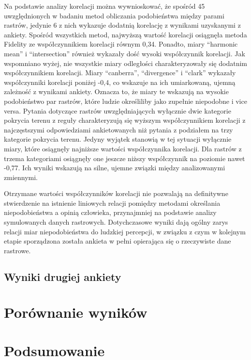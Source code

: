 \documentclass{amuthesis}
\begin{document}
Na podstawie analizy korelacji można wywnioskować, że spośród 45
uwzględnionych w badaniu metod obliczania podobieństwa między parami
rastrów, jedynie 6 z nich wykazuje dodatnią korelację z wynikami
uzyskanymi z ankiety. Spośród wszystkich metod, najwyższą wartość
korelacji osiągnęła metoda Fidelity ze współczynnikiem korelacji równym
0,34. Ponadto, miary ``harmonic mean'' i ``intersection'' również
wykazały dość wysoki współczynnik korelacji. Jak wspomniano wyżej, nie
wszystkie miary odległości charakteryzowały się dodatnim współczynnikiem
korelacji. Miary ``canberra'', ``divergence'' i ``clark'' wykazały
współczynniki korelacji poniżej -0,4, co wskazuje na ich umiarkowaną,
ujemną zależność z wynikami ankiety. Oznacza to, że miary te wskazują na
wysokie podobieństwo par rastrów, które ludzie określiliby jako zupełnie
niepodobne i vice versa. Pytania dotyczące rastrów uwzględniających
wyłącznie dwie kategorie pokrycia terenu z reguły charakteryzują się
wyższym współczynnikiem korelacji z najczęstszymi odpowiedziami
ankietowanych niż pytania z podziałem na trzy kategorie pokrycia terenu.
Jedyny wyjątek stanowią w tej sytuacji wyłącznie miary, które osiągnęły
najniższe wartości współczynnika korelacji. Dla rastrów z trzema
kategoriami osiągnęły one jeszcze niższy współczynnik na poziomie nawet
-0,77. Ich wyniki wskazują na silne, ujemne związki między analizowanymi
zmiennymi.

Otrzymane wartości współczynników korelacji nie pozwalają na definitywne
stwierdzenie na istnienie liniowych relacji pomiędzy metodami określania
niepodobieństwa a opinią człowieka, przynajmniej na podstawie analizy
symulowanych danych rastrowych. Dotychczasowe wyniki dają ogólny zarys
relacji miar niepodobieństwa do ludzkiej percepcji, w związku z czym w
kolejnym etapie sporządzona została ankieta w pełni opierająca się o
rzeczywiste dane rastrowe.

\hypertarget{sec-wyniki2}{%
\section{Wyniki drugiej ankiety}\label{sec-wyniki2}}


\hypertarget{sec-porownanie}{%
\chapter{Porównanie wyników}\label{sec-porownanie}}


\hypertarget{sec-podsumowanie}{%
\chapter{Podsumowanie}\label{sec-podsumowanie}}

\printbibliography[heading=bibintoc, title=Bibliografia]
\end{document}
